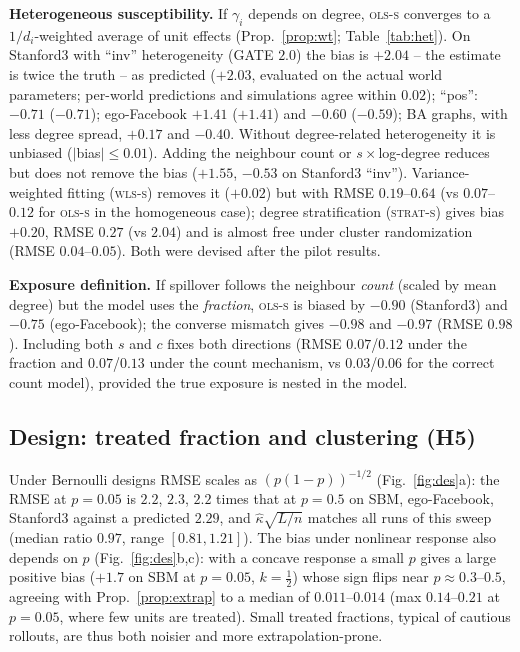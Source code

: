 \textbf{Heterogeneous susceptibility.} If $\gamma_i$ depends on degree, \textsc{ols-s} converges to a $1/d_i$-weighted average of unit effects (Prop.~\ref{prop:wt}; Table~\ref{tab:het}). On Stanford3 with ``inv'' heterogeneity (GATE $2.0$) the bias is $+2.04$ -- the estimate is twice the truth -- as predicted ($+2.03$, evaluated on the actual world parameters; per-world predictions and simulations agree within $0.02$); ``pos'': $-0.71$ ($-0.71$); ego-Facebook $+1.41$ ($+1.41$) and $-0.60$ ($-0.59$); BA graphs, with less degree spread, $+0.17$ and $-0.40$. Without degree-related heterogeneity it is unbiased ($|$bias$|\le0.01$). Adding the neighbour count or $s\times$log-degree reduces but does not remove the bias ($+1.55$, $-0.53$ on Stanford3 ``inv''). Variance-weighted fitting (\textsc{wls-s}) removes it ($+0.02$) but with RMSE $0.19$--$0.64$ (vs $0.07$--$0.12$ for \textsc{ols-s} in the homogeneous case); degree stratification (\textsc{strat-s}) gives bias $+0.20$, RMSE $0.27$ (vs $2.04$) and is almost free under cluster randomization (RMSE $0.04$--$0.05$). Both were devised after the pilot results.

\textbf{Exposure definition.} If spillover follows the neighbour \emph{count} (scaled by mean degree) but the model uses the \emph{fraction}, \textsc{ols-s} is biased by $-0.90$ (Stanford3) and $-0.75$ (ego-Facebook); the converse mismatch gives $-0.98$ and $-0.97$ (RMSE $0.98$). Including both $s$ and $c$ fixes both directions (RMSE $0.07$/$0.12$ under the fraction and $0.07$/$0.13$ under the count mechanism, vs $0.03$/$0.06$ for the correct count model), provided the true exposure is nested in the model.



\subsection{Design: treated fraction and clustering (H5)}
Under Bernoulli designs RMSE scales as $(p(1-p))^{-1/2}$ (Fig.~\ref{fig:des}a): the RMSE at $p=0.05$ is $2.2$, $2.3$, $2.2$ times that at $p=0.5$ on SBM, ego-Facebook, Stanford3 against a predicted $2.29$, and $\hat\kappa\sqrt{L/n}$ matches all runs of this sweep (median ratio $0.97$, range $[0.81,1.21]$). The bias under nonlinear response also depends on $p$ (Fig.~\ref{fig:des}b,c): with a concave response a small $p$ gives a large positive bias ($+1.7$ on SBM at $p{=}0.05$, $k{=}\frac12$) whose sign flips near $p\approx0.3$--$0.5$, agreeing with Prop.~\ref{prop:extrap} to a median of $0.011$--$0.014$ (max $0.14$--$0.21$ at $p=0.05$, where few units are treated). Small treated fractions, typical of cautious rollouts, are thus both noisier and more extrapolation-prone.

